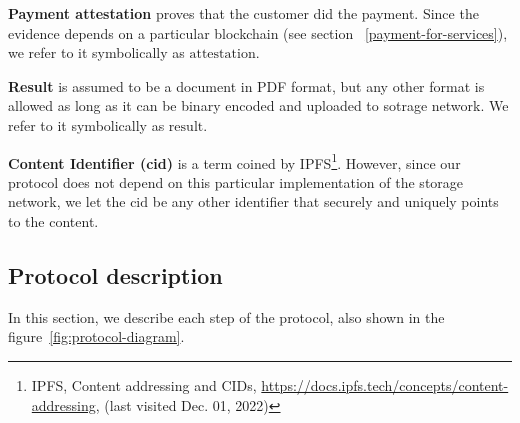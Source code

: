 \documentclass{ieeeaccess}
\begin{document}
\noindent \textbf
{Payment attestation}\label{payment-attestation} proves that the customer did the payment. Since the evidence depends on a particular blockchain (see section ~\ref{payment-for-services}), we refer to it symbolically as
\(\mathrm{attestation}\).

\noindent \textbf
{Result}\label{results} is assumed to be a document in PDF format, but any other format is allowed as long as it can be binary encoded and uploaded to sotrage network. We refer to it symbolically as $\mathrm{result}$.

\noindent \textbf
{Content Identifier (cid)}\label{content-identifier-cid} is a term coined by IPFS\footnote{IPFS, Content addressing and CIDs, \url{https://docs.ipfs.tech/concepts/content-addressing}, (last visited Dec. 01, 2022)}. However, since our protocol does not depend on this particular implementation of the storage network, we let the $\mathrm{cid}$ be any other identifier that securely and uniquely points to the content.

\subsection{Protocol description}\label{protocol-description}

In this section, we describe each step of the protocol, also shown in the figure~\ref{fig:protocol-diagram}.
\end{document}
